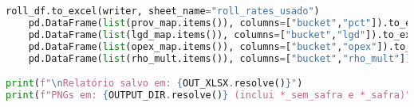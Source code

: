 \documentclass[11pt,a4paper]{article}
\newcommand{\1}{\mathbf{1}}
\begin{document}
\begin{lstlisting}[language=Python, caption={risk_frontier.py}]
    roll_df.to_excel(writer, sheet_name="roll_rates_usado")
    pd.DataFrame(list(prov_map.items()), columns=["bucket","pct"]).to_excel(writer, sheet_name="prov_reg_usado", index=False)
    pd.DataFrame(list(lgd_map.items()), columns=["bucket","lgd"]).to_excel(writer, sheet_name="lgd_bucket_usado", index=False)
    pd.DataFrame(list(opex_map.items()), columns=["bucket","opex"]).to_excel(writer, sheet_name="opex_usado", index=False)
    pd.DataFrame(list(rho_mult.items()), columns=["bucket","rho_mult"]).to_excel(writer, sheet_name="rho_mult_usado", index=False)

print(f"\nRelatório salvo em: {OUT_XLSX.resolve()}")
print(f"PNGs em: {OUTPUT_DIR.resolve()} (inclui *_sem_safra e *_safra)")
\end{lstlisting}
\end{document}
